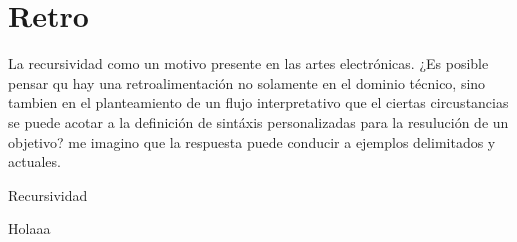 \chapter{Retro}

La recursividad como un motivo presente en las artes electrónicas. ¿Es posible pensar qu hay una retroalimentación no solamente en el dominio técnico, sino tambien en el planteamiento de un flujo interpretativo que el ciertas circustancias se puede acotar a la definición de sintáxis personalizadas para la resulución de un objetivo? me imagino que la respuesta puede conducir a ejemplos delimitados y actuales. 

Recursividad 

Holaaa

